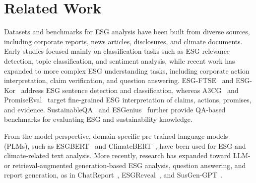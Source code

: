 \documentclass[11pt]{article}
\begin{document}
\section{Related Work}
Datasets and benchmarks for ESG analysis have been built from diverse sources, including corporate reports, news articles, disclosures, and climate documents. Early studies focused mainly on classification tasks such as ESG relevance detection, topic classification, and sentiment analysis, while recent work has expanded to more complex ESG understanding tasks, including corporate action interpretation, claim verification, and question answering. ESG-FTSE~\cite{pavlova2024esgftse} and ESG-Kor~\cite{lee2024esgkor} address ESG sentence detection and classification, whereas A3CG~\cite{ong2025towards} and PromiseEval~\cite{seki2025mlpromise} target fine-grained ESG interpretation of claims, actions, promises, and evidence. SustainableQA~\cite{ali2025sustainableqa} and ESGenius~\cite{he2025esgenius} further provide QA-based benchmarks for evaluating ESG and sustainability knowledge.

From the model perspective, domain-specific pre-trained language models (PLMs), such as ESGBERT~\cite{schimanski2024ESGBERT} and ClimateBERT~\cite{webersinke2021climatebert}, have been used for ESG and climate-related text analysis. More recently, research has expanded toward LLM- or retrieval-augmented generation-based ESG analysis, question answering, and report generation, as in ChatReport~\cite{ni2023chatreport}, ESGReveal~\cite{zou2025esgreveal}, and SusGen-GPT~\cite{wu2025susgen}.
\end{document}

